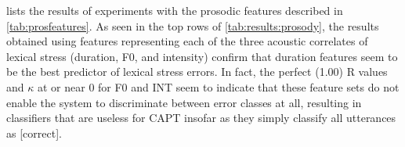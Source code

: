 \documentclass[a4paper]{article}
\begin{document}
	
		

	
		
		 lists the results of experiments with the prosodic features described in \cref{tab:prosfeatures}. As seen in the top rows of \cref{tab:results:prosody}, the results obtained using features representing each of the three acoustic correlates of lexical stress (duration, F0, and intensity) confirm that duration features seem to be the best predictor of lexical stress errors. %
		In fact, the perfect (1.00) R values and $\kappa$ at or near 0 for F0 and INT seem to indicate that these feature sets do not enable the system to discriminate between error classes at all, resulting in classifiers that are useless for CAPT insofar as they simply classify all utterances as [correct].
	

	
	
\end{document}
